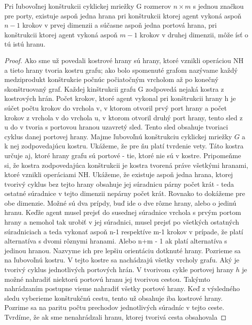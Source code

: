 \begin{lem}
Pri ľubovoľnej konštrukcii cyklickej mriežky G rozmerov $n \times m$ s jednou značkou
pre porty, existuje aspoň jedna hrana pri konštrukcii ktorej agent vykoná 
aspoň $n - 1$ krokov v prvej dimenzii
a súčasne aspoň jedna portová hrana,
 pri konštrukcii ktorej agent vykoná aspoň $m - 1$ krokov v druhej dimenzii,
môže ísť o tú istú hranu.
\end{lem}
\begin{proof}
Ako sme už povedali kostrové hrany sú hrany, ktoré vznikli operáciou NH a
tieto hrany tvoria kostru grafu; ako bolo spomenuté grafom nazývame každý
medziprodukt konštrukcie počnúc počiatočným vrcholom až po konečný
skonštruovaný graf.
Každej kinštrukcii grafu G zodpovedá nejaká kostra z kostrových hrán. Počet
krokov, ktoré agent vykonal pri konštrukcii hrany h je súčet počtu krokov do
vrchola v, v ktorom otvoril prvý port hrany a počet krokov z vrchola v do
vrchola u, v ktorom otvoril druhý port hrany, 
tento sled z u do v tvoria s portovou
hranou uzavretý sled. Tento sled obsahuje tvoriaci cyklus danej portovej
hrany.
Majme ľubovoľnú konštrukciu cyklickej mriežky $G$ a k nej zodpovedajúcu
kostru. Ukážeme, že pre ňu platí tvrdenie vety.
Táto kostra určuje aj, ktoré hrany grafu sú portové - tie, ktoré nie sú v
kostre. Pripomeňme si, že kostra zodpovedajúca konštrukcii je kostra tvorená
práve všetkými hranami, ktoré vznikli operáciami NH.
Ukážeme, že existuje aspoň jedna hrana, ktorej tvorivý cyklus bez tejto
hrany obsahuje jej
súradnicu párny počet krát - teda ostatné súradnice v tejto dimenzii nepárny
počet krát. Rovnako to dokážeme pre obe dimenzie. Možné sú dva prípdy, buď
ide o dve rôzne hrany, alebo o jedinú hranu.
Keďže agent musel prejsť do susednej súradnice vrchola s prvým portom hrany
a nemohol tak urobiť v jej súradnici, musel prejsť po všetkých ostatných
súradniciach a teda vykonať aspoň n-1 respektíve m-1 krokov v prípade, že
platí alternatíva s dvomi rôznymi hranami. Alebo n+m - 1 ak platí
alternatíva s jedinou hranou. Nazvyme ich pre lepšiu orientáciu dotknuté
hrany.
Pozrieme sa na ľubovoľnú kostru. V tejto kostre sa nachádzajú všetky vrcholy
grafu. Aký je tvorivý cyklus jednotlivých portových hrán. V tvorivom cykle
portovej hrany $h$
je možné nahradiť niektorú portovú hranu jej tvorivou cestou. Takýmto
nahrádzaním postupne vieme nahradiť všetky portové hrany. Keď z výsledného
sledu vyberieme konštrukčnú cestu, tento už obsahuje iba kostrové hrany.
Pozrime sa na paritu počtu prechodov jednotlivých súradníc v tejto ceste.
Tvrdíme, že ak sme nenahrádzali hranu, ktorej tvorivá cesta obsahovala

\end{proof}
